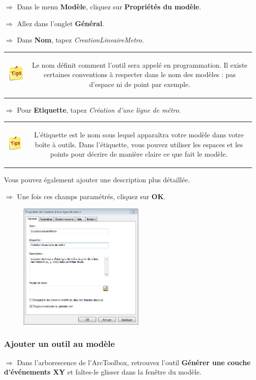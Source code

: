 \documentclass[11pt]{article}
\newcommand{\action}{$\Rightarrow$ }
\newenvironment{note}{%
	\begin{tabular}[t t]{c c}
		\includegraphics{img/tips.png}
		 &
		\begin{minipage}[c]{0.9\linewidth}
			\begin{sffamily}
}{%
			\end{sffamily}
		\end{minipage}
	\end{tabular}
}
\begin{document}
\action Dans le menu \textbf{Modèle}, cliquez sur \textbf{Propriétés du modèle}.

\action Allez dans l’onglet \textbf{Général}.

\action Dans \textbf{Nom}, tapez \textit{CreationLineaireMetro}.

\begin{note}
Le nom définit comment l'outil sera appelé en programmation. Il existe certaines conventions à respecter dans le nom des modèles : pas d'espace ni de point par exemple.
\end{note}

\action Pour \textbf{Etiquette}, tapez \textit{Création d'une ligne de métro}.

\begin{note}
L'étiquette est le nom sous lequel apparaîtra votre modèle dans votre boîte à outils. Dans l'étiquette, vous pouvez utiliser les espaces et les points pour décrire de manière claire ce que fait le modèle.
\end{note}

Vous pouvez également ajouter une description plus détaillée.

\action Une fois ces champs paramétrés, cliquez sur \textbf{OK}.
\begin{figure}[H]
	\center \includegraphics[width=0.55\textwidth]{img/td3/modelbuilder_creation.png}\\
\end{figure}


\subsubsection{Ajouter un outil au modèle}
\action Dans l'arborescence de l'ArcToolbox, retrouvez l'outil \textbf{Générer une couche d'événements XY} et faîtes-le glisser dans la fenêtre du modèle.
\end{document}
